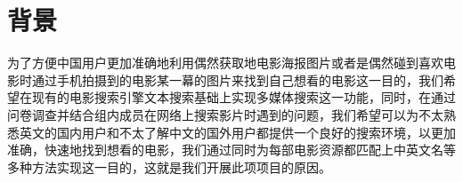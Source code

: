 \documentclass[main.tex]{subfiles}
\begin{document}
\section{背景}

为了方便中国用户更加准确地利用偶然获取地电影海报图片或者是偶然碰到喜欢电影时通过手机拍摄到的电影某一幕的图片来找到自己想看的电影这一目的，我们希望在现有的电影搜索引擎文本搜索基础上实现多媒体搜索这一功能，同时，在通过问卷调查并结合组内成员在网络上搜索影片时遇到的问题，我们希望可以为不太熟悉英文的国内用户和不太了解中文的国外用户都提供一个良好的搜索环境，以更加准确，快速地找到想看的电影，我们通过同时为每部电影资源都匹配上中英文名等多种方法实现这一目的，这就是我们开展此项项目的原因。
\end{document}
